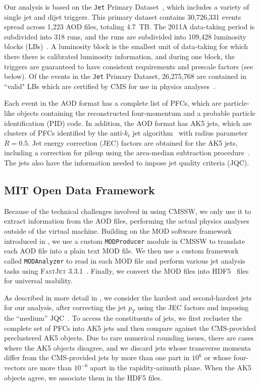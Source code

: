 \documentclass[aps,prd,twocolumn,preprintnumbers,nofootinbib,longbibliography,floatfix,superscriptaddress]{revtex4-1}
\begin{document}
Our analysis is based on the \texttt{Jet} Primary Dataset~\cite{CMS:JetPrimary2011A}, which includes a variety of single jet and dijet triggers.
%
This primary dataset contains 30,726,331 events spread across 1,223 AOD files, totaling \SI{4.7}{TB}.
%
The 2011A data-taking period is subdivided into 318 runs, and the runs are subdivided into 109,428 luminosity blocks (LBs)~\cite{CMS:luminosity2011}.
%
A luminosity block is the smallest unit of data-taking for which there there is calibrated luminosity information, and during one block, the triggers are guaranteed to have consistent requirements and prescale factors (see  below).
%
Of the events in the \texttt{Jet} Primary Dataset, 26,275,768 are contained in ``valid" LBs which are certified by CMS for use in physics analyses~\cite{CMS:ValidatedRuns2011A}.


Each event in the AOD format has a complete list of PFCs, which are particle-like objects containing the reconstructed four-momentum and a probable particle identification (PID) code.
%
In addition, the AOD format has AK5 jets, which are clusters of PFCs identified by the anti-$k_t$ jet algorithm~\cite{Cacciari:2008gp} with radius parameter $R = 0.5$.
%
Jet energy correction (JEC) factors are obtained for the AK5 jets, including a correction for pileup using the area-median subtraction procedure~\cite{Cacciari:2008gn}.
%
The jets also have the information needed to impose jet quality criteria (JQC).


\subsection{MIT Open Data Framework}
\label{subsec:modformat}


Because of the technical challenges involved in using CMSSW, we only use it to extract information from the AOD files, performing the actual physics analyses outside of the virtual machine.
%
Building on the MOD software framework introduced in , we use a custom \texttt{MODProducer} module in CMSSW to translate each AOD file into a plain text MOD file.
%
We then use a custom framework called \texttt{MODAnalyzer} to read in each MOD file and perform various jet analysis tasks using \textsc{FastJet} 3.3.1~\cite{Cacciari:2011ma}.
%
Finally, we convert the MOD files into HDF5~\cite{hdf5} files for universal usability.


As described in more detail in , we consider the hardest and second-hardest jets for our analysis, after correcting the jet $p_T$ using the JEC factors and imposing the ``medium'' JQC~\cite{CMS:2010xta,2011JInst...611002C}.
%
To access the constituents of jets, we first recluster the complete set of PFCs into AK5 jets and then compare against the CMS-provided preclustered AK5 objects.
%
Due to rare numerical rounding issues, there are cases where the AK5 objects disagree, and we discard jets whose transverse momenta differ from the CMS-provided jets by more than one part in $10^{6}$ or whose four-vectors are more than $10^{-6}$ apart in the rapidity-azimuth plane.
%
When the AK5 objects agree, we associate them in the HDF5 files.
\end{document}
